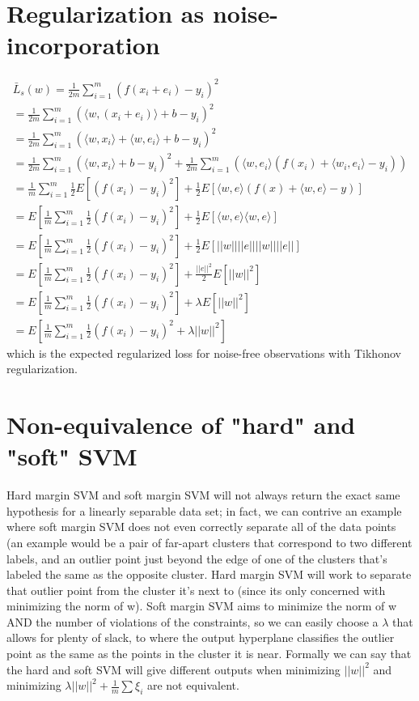 \documentclass{article}
\begin{document}
\section{Regularization as noise-incorporation}
\begin{equation}
\begin{split}
\bar{L}_s(w) = \frac{1}{2m}\sum_{i=1}^{m}(f(x_i +e_i)-y_i)^2 \\
= \frac{1}{2m}\sum_{i=1}^{m}(\langle w, (x_i +e_i) \rangle + b-y_i)^2 \\
= \frac{1}{2m}\sum_{i=1}^{m}(\langle w, x_i \rangle + \langle w,e_i \rangle + b -y_i)^2 \\
=\frac{1}{2m}\sum_{i=1}^{m}(\langle w, x_i \rangle +b -y_i)^2 + \frac{1}{2m}\sum_{i=1}^{m}(\langle w,e_i \rangle(f(x_i) + \langle w_i,e_i \rangle-y_i)) \\
=\frac{1}{m}\sum_{i=1}^{m}\frac{1}{2}E[(f(x_i) -y_i)^2] + \frac{1}{2}E[\langle w,e \rangle(f(x) + \langle w,e \rangle  -y)] \\
=E[\frac{1}{m}\sum_{i=1}^{m}\frac{1}{2}(f(x_i) -y_i)^2] + \frac{1}{2}E[\langle w,e \rangle\langle w,e \rangle] \\
=E[\frac{1}{m}\sum_{i=1}^{m}\frac{1}{2}(f(x_i) -y_i)^2] + \frac{1}{2}E[||w||||e||||w||||e||] \\
=E[\frac{1}{m}\sum_{i=1}^{m}\frac{1}{2}(f(x_i) -y_i)^2] + \frac{||e||^2}{2}E[||w||^2] \\
=E[\frac{1}{m}\sum_{i=1}^{m}\frac{1}{2}(f(x_i) -y_i)^2] + \lambda E[||w||^2] \\
=E[\frac{1}{m}\sum_{i=1}^{m}\frac{1}{2}(f(x_i) -y_i)^2 + \lambda ||w||^2]
\end{split}
\end{equation}
which is the expected regularized loss for noise-free observations with Tikhonov regularization.



\section{Non-equivalence of "hard" and "soft" SVM}
Hard margin SVM and soft margin SVM will not always return the exact same hypothesis for a linearly separable data set; in fact, we can contrive an example where soft margin SVM does not even correctly separate all of the data points (an example would be a pair of far-apart clusters that correspond to two different labels, and an outlier point just beyond the edge of one of the clusters that's labeled the same as the opposite cluster. Hard margin SVM will work to separate that outlier point from the cluster it's next to (since its only concerned with minimizing the norm of w). Soft margin SVM aims to minimize the norm of w AND the number of violations of the constraints, so we can easily choose a \(\lambda\) that allows for plenty of slack, to where the output hyperplane classifies the outlier point as the same as the points in the cluster it is near. Formally we can say that the hard and soft SVM will give different outputs when minimizing \(||w||^2\) and  minimizing \(\lambda||w||^2 + \frac{1}{m} \sum \xi_i\) are not equivalent.
\end{document}
